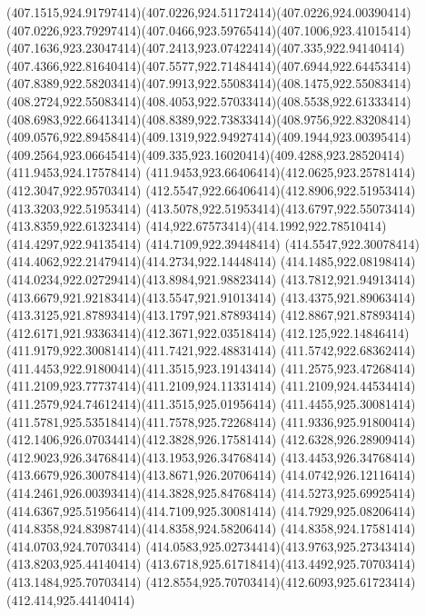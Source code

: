 {{	\curveto(407.1515,924.91797414)(407.0226,924.51172414)(407.0226,924.00390414)
	\curveto(407.0226,923.79297414)(407.0466,923.59765414)(407.1006,923.41015414)
	\curveto(407.1636,923.23047414)(407.2413,923.07422414)(407.335,922.94140414)
	\curveto(407.4366,922.81640414)(407.5577,922.71484414)(407.6944,922.64453414)
	\curveto(407.8389,922.58203414)(407.9913,922.55083414)(408.1475,922.55083414)
	\curveto(408.2724,922.55083414)(408.4053,922.57033414)(408.5538,922.61333414)
	\curveto(408.6983,922.66413414)(408.8389,922.73833414)(408.9756,922.83208414)
	\curveto(409.0576,922.89458414)(409.1319,922.94927414)(409.1944,923.00395414)
	\curveto(409.2564,923.06645414)(409.335,923.16020414)(409.4288,923.28520414)
	\closepath
	\moveto(411.9453,924.17578414)
	\curveto(411.9453,923.66406414)(412.0625,923.25781414)(412.3047,922.95703414)
	\curveto(412.5547,922.66406414)(412.8906,922.51953414)(413.3203,922.51953414)
	\curveto(413.5078,922.51953414)(413.6797,922.55073414)(413.8359,922.61323414)
	\curveto(414,922.67573414)(414.1992,922.78510414)(414.4297,922.94135414)
	\lineto(414.7109,922.39448414)
	\curveto(414.5547,922.30078414)(414.4062,922.21479414)(414.2734,922.14448414)
	\curveto(414.1485,922.08198414)(414.0234,922.02729414)(413.8984,921.98823414)
	\curveto(413.7812,921.94913414)(413.6679,921.92183414)(413.5547,921.91013414)
	\curveto(413.4375,921.89063414)(413.3125,921.87893414)(413.1797,921.87893414)
	\curveto(412.8867,921.87893414)(412.6171,921.93363414)(412.3671,922.03518414)
	\curveto(412.125,922.14846414)(411.9179,922.30081414)(411.7421,922.48831414)
	\curveto(411.5742,922.68362414)(411.4453,922.91800414)(411.3515,923.19143414)
	\curveto(411.2575,923.47268414)(411.2109,923.77737414)(411.2109,924.11331414)
	\curveto(411.2109,924.44534414)(411.2579,924.74612414)(411.3515,925.01956414)
	\curveto(411.4455,925.30081414)(411.5781,925.53518414)(411.7578,925.72268414)
	\curveto(411.9336,925.91800414)(412.1406,926.07034414)(412.3828,926.17581414)
	\curveto(412.6328,926.28909414)(412.9023,926.34768414)(413.1953,926.34768414)
	\curveto(413.4453,926.34768414)(413.6679,926.30078414)(413.8671,926.20706414)
	\curveto(414.0742,926.12116414)(414.2461,926.00393414)(414.3828,925.84768414)
	\curveto(414.5273,925.69925414)(414.6367,925.51956414)(414.7109,925.30081414)
	\curveto(414.7929,925.08206414)(414.8358,924.83987414)(414.8358,924.58206414)
	\lineto(414.8358,924.17581414)
	\closepath
	\moveto(414.0703,924.70703414)
	\curveto(414.0583,925.02734414)(413.9763,925.27343414)(413.8203,925.44140414)
	\curveto(413.6718,925.61718414)(413.4492,925.70703414)(413.1484,925.70703414)
	\curveto(412.8554,925.70703414)(412.6093,925.61723414)(412.414,925.44140414)
}}

